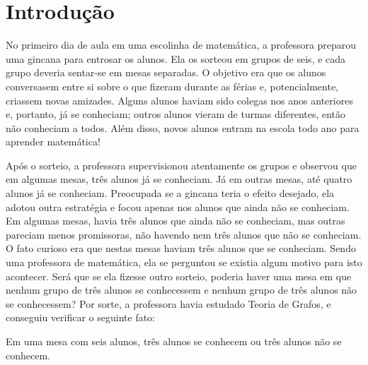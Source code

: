 
\chapter{Introdução}

No primeiro dia de aula em uma escolinha de matemática, a professora preparou uma gincana para entrosar os alunos. Ela os sorteou em grupos de seis, e cada grupo deveria sentar-se em mesas separadas. O objetivo era que os alunos conversasem entre si sobre o que fizeram durante as férias e, potencialmente, criassem novas amizades. Alguns alunos haviam sido colegas nos anos anteriores e, portanto, já se conheciam; outros alunos vieram de turmas diferentes, então não conheciam a todos. Além disso, novos alunos entram na escola todo ano para aprender matemática!

Após o sorteio, a professora supervisionou atentamente os grupos e observou que em algumas mesas, três alunos já se conheciam. Já em outras mesas, até quatro alunos já se conheciam. Preocupada se a gincana teria o efeito desejado, ela adotou outra estratégia e focou apenas nos alunos que ainda não se conheciam. Em algumas mesas, havia três alunos que ainda não se conheciam, mas outras pareciam menos promissoras, não havendo nem três alunos que não se conheciam. O fato curioso era que nestas mesas haviam três alunos que se conheciam. Sendo uma professora de matemática, ela se perguntou se existia algum motivo para isto acontecer. Será que se ela fizesse outro sorteio, poderia haver uma mesa em que nenhum grupo de três alunos se conhecessem e nenhum grupo de três alunos não se conhecessem? Por sorte, a professora havia estudado Teoria de Grafos, e conseguiu verificar o seguinte fato:

\begin{fact} \label{fact:intro:ramsey}
Em uma mesa com seis alunos, três alunos se conhecem ou três alunos não se conhecem.
\end{fact}

